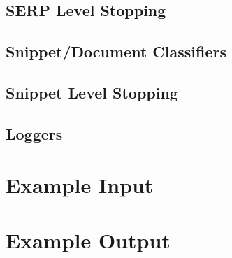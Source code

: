\subsection{SERP Level Stopping}

\subsection{Snippet/Document Classifiers}

\subsection{Snippet Level Stopping}

\subsection{Loggers}

\section{Example Input}

\section{Example Output}